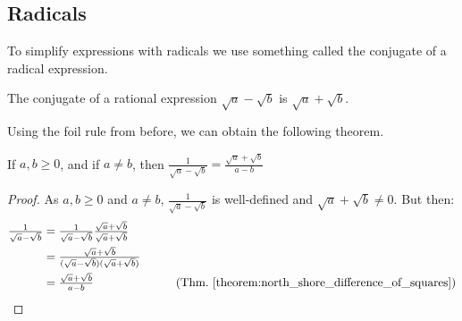\documentclass[crop=false,class=article,oneside]{standalone}
\begin{document}
    \subsection{Radicals}
        To simplify expressions with radicals we use something called the conjugate of a radical expression. 
        \begin{definition}
        The conjugate of a rational expression $\sqrt{a}-\sqrt{b}$ is $\sqrt{a}+\sqrt{b}$.
        \end{definition}
        Using the \gls{foil} rule from before, we can obtain the following theorem.
        \begin{theorem}
        If $a,b\geq 0$, and if $a\ne b$, then $\frac{1}{\sqrt{a}-\sqrt{b}}=\frac{\sqrt{a}+\sqrt{b}}{a-b}$
        \end{theorem}
        \begin{proof}
        As $a,b\geq 0$ and $a\ne b$, $\frac{1}{\sqrt{a}-\sqrt{b}}$ is well-defined and $\sqrt{a}+\sqrt{b}\ne 0$. But then:
        \begin{align*}
            \tfrac{1}{\sqrt{a}-\sqrt{b}}&=\tfrac{1}{\sqrt{a}-\sqrt{b}}\tfrac{\sqrt{a}+\sqrt{b}}{\sqrt{a}+\sqrt{b}}\\
            &=\tfrac{\sqrt{a}+\sqrt{b}}{(\sqrt{a}-\sqrt{b})(\sqrt{a}+\sqrt{b})}\\
            &=\tfrac{\sqrt{a}+\sqrt{b}}{a-b}&\tag{Thm.~\ref{theorem:north_shore_difference_of_squares}}
        \end{align*}
        \end{proof}
\end{document}
